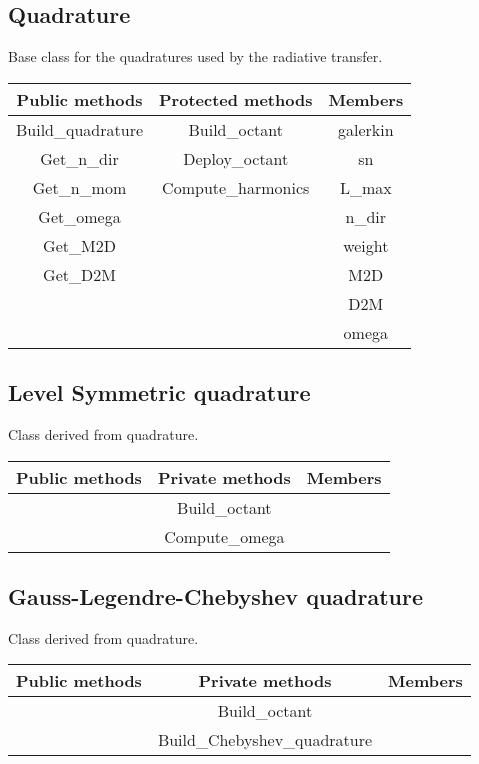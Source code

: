 \subsection{Quadrature}
Base class for the quadratures used by the radiative transfer.
\begin{table}[H]
  \centering
  \begin{tabular}{|c|c|c|}
    \hline
    Public methods & Protected methods & Members \\
    \hline
    Build\_quadrature & Build\_octant      & galerkin \\
          Get\_n\_dir & Deploy\_octant          & sn \\
          Get\_n\_mom & Compute\_harmonics & L\_max \\
           Get\_omega &                         & n\_dir \\
             Get\_M2D &                         & weight \\
             Get\_D2M &                         & M2D \\
                      &                         & D2M \\
                      &                         & omega \\
    \hline
  \end{tabular}
\end{table}

\subsection{Level Symmetric quadrature}
Class derived from quadrature.
\begin{table}[H]
  \centering
  \begin{tabular}{|c|c|c|}
    \hline
    Public methods & Private methods & Members \\
    \hline
    & Build\_octant  & \\
    & Compute\_omega & \\
    \hline
  \end{tabular}
\end{table}

\subsection{Gauss-Legendre-Chebyshev quadrature}
Class derived from quadrature.
\begin{table}[H]
  \centering
  \begin{tabular}{|c|c|c|}
    \hline
    Public methods & Private methods & Members \\
    \hline
    & Build\_octant & \\
    & Build\_Chebyshev\_quadrature & \\
    \hline
  \end{tabular}
\end{table} 

